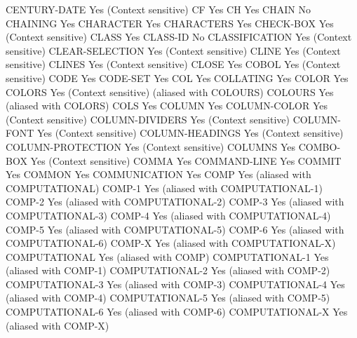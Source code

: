 CENTURY-DATE                    Yes (Context sensitive)
CF                              Yes
CH                              Yes
CHAIN                           No
CHAINING                        Yes
CHARACTER                       Yes
CHARACTERS                      Yes
CHECK-BOX                       Yes (Context sensitive)
CLASS                           Yes
CLASS-ID                        No
CLASSIFICATION                  Yes (Context sensitive)
CLEAR-SELECTION                 Yes (Context sensitive)
CLINE                           Yes (Context sensitive)
CLINES                          Yes (Context sensitive)
CLOSE                           Yes
COBOL                           Yes (Context sensitive)
CODE                            Yes
CODE-SET                        Yes
COL                             Yes
COLLATING                       Yes
COLOR                           Yes
COLORS                          Yes (Context sensitive) (aliased with COLOURS)
COLOURS                         Yes (aliased with COLORS)
COLS                            Yes
COLUMN                          Yes
COLUMN-COLOR                    Yes (Context sensitive)
COLUMN-DIVIDERS                 Yes (Context sensitive)
COLUMN-FONT                     Yes (Context sensitive)
COLUMN-HEADINGS                 Yes (Context sensitive)
COLUMN-PROTECTION               Yes (Context sensitive)
COLUMNS                         Yes
COMBO-BOX                       Yes (Context sensitive)
COMMA                           Yes
COMMAND-LINE                    Yes
COMMIT                          Yes
COMMON                          Yes
COMMUNICATION                   Yes
COMP                            Yes (aliased with COMPUTATIONAL)
COMP-1                          Yes (aliased with COMPUTATIONAL-1)
COMP-2                          Yes (aliased with COMPUTATIONAL-2)
COMP-3                          Yes (aliased with COMPUTATIONAL-3)
COMP-4                          Yes (aliased with COMPUTATIONAL-4)
COMP-5                          Yes (aliased with COMPUTATIONAL-5)
COMP-6                          Yes (aliased with COMPUTATIONAL-6)
COMP-X                          Yes (aliased with COMPUTATIONAL-X)
COMPUTATIONAL                   Yes (aliased with COMP)
COMPUTATIONAL-1                 Yes (aliased with COMP-1)
COMPUTATIONAL-2                 Yes (aliased with COMP-2)
COMPUTATIONAL-3                 Yes (aliased with COMP-3)
COMPUTATIONAL-4                 Yes (aliased with COMP-4)
COMPUTATIONAL-5                 Yes (aliased with COMP-5)
COMPUTATIONAL-6                 Yes (aliased with COMP-6)
COMPUTATIONAL-X                 Yes (aliased with COMP-X)
